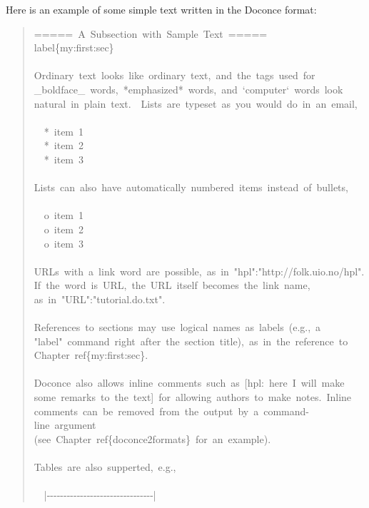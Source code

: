 \documentclass[a4paper,english]{article}
\begin{document}
Here is an example of some simple text written in the Doconce format:
%
\begin{quote}{\ttfamily \raggedright \noindent
=====~A~Subsection~with~Sample~Text~=====\\
label\{my:first:sec\}\\
~\\
Ordinary~text~looks~like~ordinary~text,~and~the~tags~used~for\\
\_boldface\_~words,~*emphasized*~words,~and~`computer`~words~look\\
natural~in~plain~text.~~Lists~are~typeset~as~you~would~do~in~an~email,\\
~\\
~~*~item~1\\
~~*~item~2\\
~~*~item~3\\
~\\
Lists~can~also~have~automatically~numbered~items~instead~of~bullets,\\
~\\
~~o~item~1\\
~~o~item~2\\
~~o~item~3\\
~\\
URLs~with~a~link~word~are~possible,~as~in~"hpl":"http://folk.uio.no/hpl".\\
If~the~word~is~URL,~the~URL~itself~becomes~the~link~name,\\
as~in~"URL":"tutorial.do.txt".\\
~\\
References~to~sections~may~use~logical~names~as~labels~(e.g.,~a\\
"label"~command~right~after~the~section~title),~as~in~the~reference~to\\
Chapter~ref\{my:first:sec\}.\\
~\\
Doconce~also~allows~inline~comments~such~as~{[}hpl:~here~I~will~make\\
some~remarks~to~the~text{]}~for~allowing~authors~to~make~notes.~Inline\\
comments~can~be~removed~from~the~output~by~a~command-line~argument\\
(see~Chapter~ref\{doconce2formats\}~for~an~example).\\
~\\
Tables~are~also~supperted,~e.g.,\\
~\\
~~|-{}-{}-{}-{}-{}-{}-{}-{}-{}-{}-{}-{}-{}-{}-{}-{}-{}-{}-{}-{}-{}-{}-{}-{}-{}-{}-{}-{}-{}-{}-{}-|\\
}
\end{quote}
\end{document}
